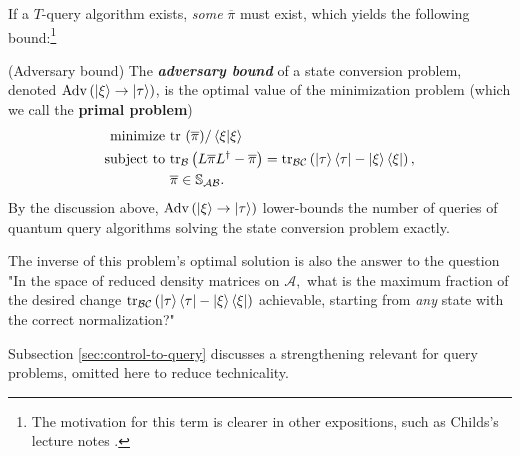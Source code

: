 \documentclass{article}
\begin{document}
If a $\displaystyle T$-query algorithm exists, \textit{some }$\displaystyle \overline{\pi }$ must exist, which yields the following bound:\footnote{The motivation for this term is clearer in other expositions, such as Childs's lecture notes \cite{childs2017lecture}.}
\begin{definition}
(Adversary bound) The \textbf{\textit{adversary bound}} of a state conversion problem, denoted $\displaystyle \mathrm{Adv}\left(\ket{\xi }\rightarrow \ket{\tau }\right)$, is the optimal value of the minimization problem (which we call the \textbf{primal problem})
\begin{align*}
\mathrm{minimize} & \ \mathrm{tr} \ (\overline{\pi }) /\bra{\xi }\ket{\xi }\\
\mathrm{subject\ to} & \ \mathrm{tr}_{\mathcal{B}}\left( L\overline{\pi } L^{\dagger } -\overline{\pi }\right) =\mathrm{tr}_{\mathcal{BC}}\left(\ket{\tau }\bra{\tau } -\ket{\xi }\bra{\xi }\right) ,\\
 & \ \overline{\pi } \in \mathbb{S}_{\mathcal{AB}} .
\end{align*}
By the discussion above, $\displaystyle \mathrm{Adv}\left(\ket{\xi }\rightarrow \ket{\tau }\right)$ lower-bounds the number of queries of quantum query algorithms solving the state conversion problem exactly.
\end{definition}
The inverse of this problem's optimal solution is also the answer to the question "In the space of reduced density matrices on $\displaystyle \mathcal{A} ,$ what is the maximum fraction of the desired change $\displaystyle \mathrm{tr}_{\mathcal{BC}}\left(\ket{\tau }\bra{\tau } -\ket{\xi }\bra{\xi }\right)$ achievable, starting from \textit{any }state with the correct normalization?"



Subsection \ref{sec:control-to-query} discusses a strengthening relevant for query problems, omitted here to reduce technicality.
\end{document}
